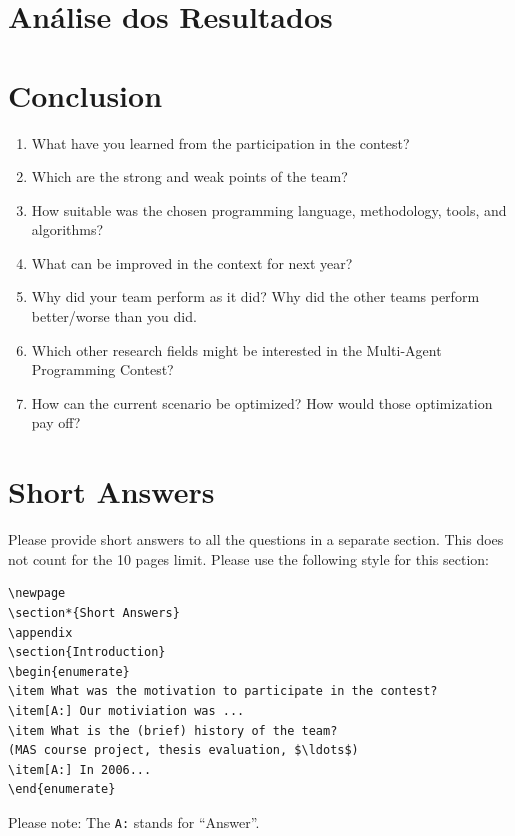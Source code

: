 \documentclass{llncs}
\begin{document}
\section{Análise dos Resultados}



\section{Conclusion}
\begin{enumerate}
\item What have you learned from the participation in the contest?
\item Which are the strong and weak points of the team?
\item How suitable was the chosen programming language, methodology,
  tools, and algorithms?
\item What can be improved in the context for next year?
\item Why did your team perform as it did? Why did the other teams perform better/worse than you did.
\item Which other research fields might be interested in the Multi-Agent Programming Contest?
\item How can the current scenario be optimized? How would those optimization pay off?
\end{enumerate}

\newpage
\section*{Short Answers}

Please provide short answers to all the questions in a separate section. This
does not count for the 10 pages limit. Please use the following style for this section:

\begin{verbatim}
\newpage
\section*{Short Answers}
\appendix
\section{Introduction}
\begin{enumerate}
\item What was the motivation to participate in the contest?
\item[A:] Our motiviation was ...
\item What is the (brief) history of the team?
(MAS course project, thesis evaluation, $\ldots$)
\item[A:] In 2006...
\end{enumerate}
\end{verbatim}
Please note: The \verb|A:| stands for "`Answer"'.

{}

\end{document}
